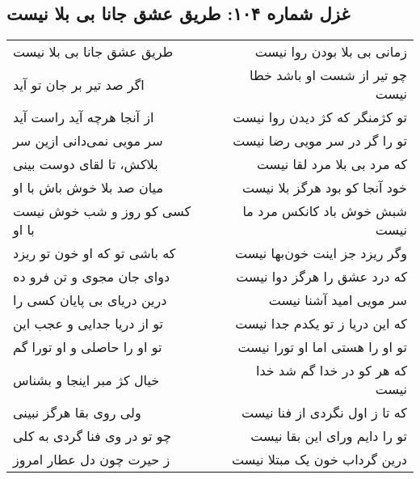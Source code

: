 \begin{center}
\section*{غزل شماره ۱۰۴: طریق عشق جانا بی بلا نیست}
\label{sec:104}
\begin{longtable}{l p{0.5cm} r}
طریق عشق جانا بی بلا نیست
&&
زمانی بی بلا بودن روا نیست
\\
اگر صد تیر بر جان تو آید
&&
چو تیر از شست او باشد خطا نیست
\\
از آنجا هرچه آید راست آید
&&
تو کژمنگر که کژ دیدن روا نیست
\\
سر مویی نمی‌دانی ازین سر
&&
تو را گر در سر مویی رضا نیست
\\
بلاکش، تا لقای دوست بینی
&&
که مرد بی بلا مرد لقا نیست
\\
میان صد بلا خوش باش با او
&&
خود آنجا کو بود هرگز بلا نیست
\\
کسی کو روز و شب خوش نیست با او
&&
شبش خوش باد کانکس مرد ما نیست
\\
که باشی تو که او خون تو ریزد
&&
وگر ریزد جز اینت خون‌بها نیست
\\
دوای جان مجوی و تن فرو ده
&&
که درد عشق را هرگز دوا نیست
\\
درین دریای بی پایان کسی را
&&
سر مویی امید آشنا نیست
\\
تو از دریا جدایی و عجب این
&&
که این دریا ز تو یکدم جدا نیست
\\
تو او را حاصلی و او تورا گم
&&
تو او را هستی اما او تورا نیست
\\
خیال کژ مبر اینجا و بشناس
&&
که هر کو در خدا گم شد خدا نیست
\\
ولی روی بقا هرگز نبینی
&&
که تا ز اول نگردی از فنا نیست
\\
چو تو در وی فنا گردی به کلی
&&
تو را دایم ورای این بقا نیست
\\
ز حیرت چون دل عطار امروز
&&
درین گرداب خون یک مبتلا نیست
\\
\end{longtable}
\end{center}
